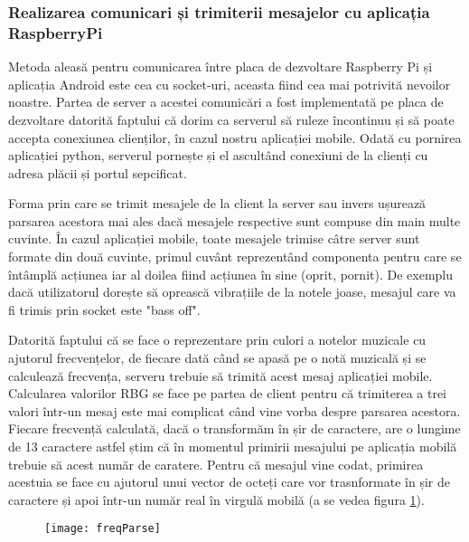 \documentclass[../IoMusT.tex]{subfiles}
\begin{document}
\subsubsection{Realizarea comunicari și trimiterii mesajelor cu aplicația RaspberryPi}
Metoda aleasă pentru comunicarea între placa de dezvoltare Raspberry Pi și aplicația Android este cea cu socket-uri, aceasta fiind cea mai potrivită nevoilor noastre. Partea de server a acestei comunicări a fost implementată pe placa de dezvoltare datorită faptului că dorim ca serverul să ruleze încontinuu și să poate accepta conexiunea clienților, în cazul nostru aplicației mobile. Odată cu pornirea aplicației python, serverul pornește și el ascultând conexiuni de la clienți cu adresa plăcii și portul sepcificat.
\\
\par Forma prin care se trimit mesajele de la client la server sau invers ușurează parsarea acestora mai ales dacă mesajele respective sunt compuse din main multe cuvinte. În cazul aplicației mobile, toate mesajele trimise câtre server sunt formate din două cuvinte, primul cuvânt reprezentând componenta pentru care se întâmplă acțiunea iar al doilea fiind acțiunea în sine (oprit, pornit). De exemplu dacă utilizatorul dorește să oprească vibrațiile de la notele joase, mesajul care va fi trimis prin socket este "bass off". 
\\
\par Datorită faptului că se face o reprezentare prin culori a notelor muzicale cu ajutorul frecvențelor, de fiecare dată când se apasă pe o notă muzicală și se calculează frecvența, serveru trebuie să trimită acest mesaj aplicației mobile. Calcularea valorilor RBG se face pe partea de client pentru că trimiterea a trei valori într-un mesaj este mai complicat când vine vorba despre parsarea acestora. Fiecare frecvență calculată, dacă o transformăm în șir de caractere, are o lungime de 13 caractere astfel știm că în momentul primirii mesajului pe aplicația mobilă trebuie să acest număr de caratere. Pentru că mesajul vine codat, primirea acestuia se face cu ajutorul unui vector de octeți care vor trasnformate în șir de caractere și apoi într-un număr real în virgulă mobilă (a se vedea figura \ref{fig:freqParse}).
\begin{figure}[h]
\centering
\texttt{[image: freqParse]}
\caption{}
\label{fig:freqParse}
\end{figure} 
\end{document}
